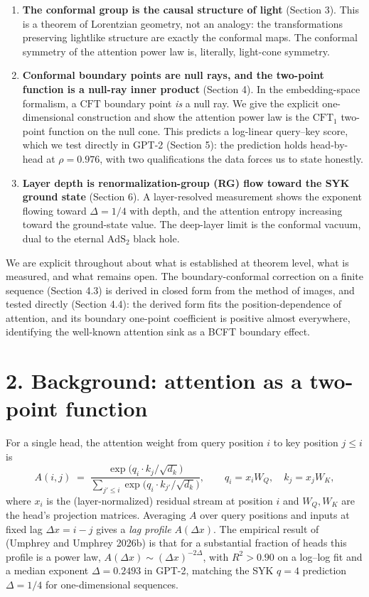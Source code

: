 \begin{enumerate}
\def\labelenumi{\arabic{enumi}.}
\item
  \textbf{The conformal group is the causal structure of light} (Section
  3). This is a theorem of Lorentzian geometry, not an analogy: the
  transformations preserving lightlike structure are exactly the
  conformal maps. The conformal symmetry of the attention power law is,
  literally, light-cone symmetry.
\item
  \textbf{Conformal boundary points are null rays, and the two-point
  function is a null-ray inner product} (Section 4). In the
  embedding-space formalism, a \(\mathrm{CFT}\) boundary point \emph{is}
  a null ray. We give the explicit one-dimensional construction and show
  the attention power law is the \(\mathrm{CFT}_1\) two-point function
  on the null cone. This predicts a log-linear query--key score, which
  we test directly in GPT-2 (Section 5): the prediction holds
  head-by-head at \(\rho = 0.976\), with two qualifications the data
  forces us to state honestly.
\item
  \textbf{Layer depth is renormalization-group (RG) flow toward the SYK
  ground state} (Section 6). A layer-resolved measurement shows the
  exponent flowing toward \(\Delta = 1/4\) with depth, and the attention
  entropy increasing toward the ground-state value. The deep-layer limit
  is the conformal vacuum, dual to the eternal \(\mathrm{AdS}_2\) black
  hole.
\end{enumerate}

We are explicit throughout about what is established at theorem level,
what is measured, and what remains open. The boundary-conformal
correction on a finite sequence (Section 4.3) is derived in closed form
from the method of images, and tested directly (Section 4.4): the
derived form fits the position-dependence of attention, and its boundary
one-point coefficient is positive almost everywhere, identifying the
well-known attention sink as a BCFT boundary effect.

\section{2. Background: attention as a two-point
function}\label{background-attention-as-a-two-point-function}

For a single head, the attention weight from query position \(i\) to key
position \(j \le i\) is \[
A(i,j) \;=\; \frac{\exp\!\big(q_i \cdot k_j / \sqrt{d_k}\big)}
                  {\sum_{j' \le i} \exp\!\big(q_i \cdot k_{j'} / \sqrt{d_k}\big)},
\qquad
q_i = x_i W_Q, \quad k_j = x_j W_K,
\] where \(x_i\) is the (layer-normalized) residual stream at position
\(i\) and \(W_Q, W_K\) are the head's projection matrices. Averaging
\(A\) over query positions and inputs at fixed lag \(\Delta x = i-j\)
gives a \emph{lag profile} \(A(\Delta x)\). The empirical result of
(Umphrey and Umphrey 2026b) is that for a substantial fraction of heads
this profile is a power law, \(A(\Delta x) \sim (\Delta x)^{-2\Delta}\),
with \(R^2 > 0.90\) on a log--log fit and a median exponent
\(\Delta = 0.2493\) in GPT-2, matching the SYK \(q=4\) prediction
\(\Delta = 1/4\) for one-dimensional sequences.


